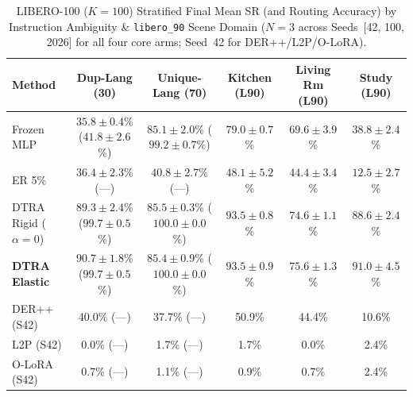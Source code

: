 \documentclass[10pt]{article}
\begin{document}
\begin{table}[ht!]
  \centering
  \caption{LIBERO-100 ($K=100$) Stratified Final Mean SR (and Routing Accuracy) by Instruction Ambiguity \& \texttt{libero\_90} Scene Domain ($N=3$ across Seeds~[42, 100, 2026] for all four core arms; Seed~42 for DER++/L2P/O-LoRA).}
  \label{tab:libero_stratified}
  \fontsize{8.0pt}{9.8pt}\selectfont
  \setlength{\tabcolsep}{2.6pt}
  \begin{tabular}{lccccc}
    \toprule
    \textbf{Method} & \textbf{Dup-Lang (30)} & \textbf{Unique-Lang (70)} & \textbf{Kitchen (L90)} & \textbf{Living Rm (L90)} & \textbf{Study (L90)} \\
    \midrule
    Frozen MLP & $35.8 \pm 0.4$\% ($41.8 \pm 2.6$\%) & $85.1 \pm 2.0$\% ($99.2 \pm 0.7$\%) & $79.0 \pm 0.7$\% & $69.6 \pm 3.9$\% & $38.8 \pm 2.4$\% \\
    ER 5\% & $36.4 \pm 2.3$\% (---) & $40.8 \pm 2.7$\% (---) & $48.1 \pm 5.2$\% & $44.4 \pm 3.4$\% & $12.5 \pm 2.7$\% \\
    DTRA Rigid ($\alpha=0$) & $89.3 \pm 2.4$\% ($99.7 \pm 0.5$\%) & $85.5 \pm 0.3$\% ($100.0 \pm 0.0$\%) & $93.5 \pm 0.8$\% & $74.6 \pm 1.1$\% & $88.6 \pm 2.4$\% \\
    \textbf{DTRA Elastic} & $90.7 \pm 1.8$\% ($99.7 \pm 0.5$\%) & $85.4 \pm 0.9$\% ($100.0 \pm 0.0$\%) & $93.5 \pm 0.9$\% & $75.6 \pm 1.3$\% & $91.0 \pm 4.5$\% \\
    \midrule
    DER++ (S42) & 40.0\% (---) & 37.7\% (---) & 50.9\% & 44.4\% & 10.6\% \\
    L2P (S42) & 0.0\% (---) & 1.7\% (---) & 1.7\% & 0.0\% & 2.4\% \\
    O-LoRA (S42) & 0.7\% (---) & 1.1\% (---) & 0.9\% & 0.7\% & 2.4\% \\
    \bottomrule
  \end{tabular}
\end{table}
\end{document}
